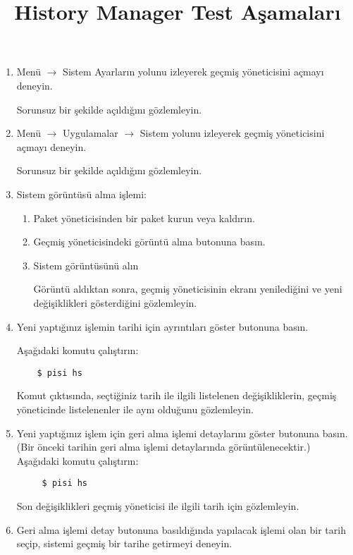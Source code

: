 \documentclass[a4paper,10pt]{article}
\title{History Manager Test Aşamaları}
\begin{document}
\maketitle

\begin{enumerate}
\item Menü $\rightarrow$ Sistem Ayarların yolunu izleyerek geçmiş yöneticisini açmayı deneyin.

Sorunsuz bir şekilde açıldığını gözlemleyin.
\item Menü $\rightarrow$ Uygulamalar $\rightarrow$ Sistem yolunu izleyerek geçmiş yöneticisini açmayı deneyin.

Sorunsuz bir şekilde açıldığını gözlemleyin.
\item Sistem görüntüsü alma işlemi:
\begin{enumerate}
    \item Paket yöneticisinden bir paket kurun veya kaldırın.
    \item Geçmiş yöneticisindeki görüntü alma butonuna basın.
    \item Sistem görüntüsünü alın

   Görüntü aldıktan sonra, geçmiş yöneticisinin ekranı yenilediğini ve yeni değişiklikleri gösterdiğini gözlemleyin.
\end{enumerate}

\item Yeni yaptığınız işlemin tarihi için ayrıntıları göster butonuna basın.

    Aşağıdaki komutu çalıştırın:
\begin{verbatim}
    $ pisi hs
\end{verbatim} 

    Komut çıktısında, seçtiğiniz tarih ile ilgili listelenen değişikliklerin, geçmiş yöneticinde listelenenler ile aynı olduğunu gözlemleyin.

\item Yeni yaptığınız işlem için geri alma işlemi detaylarını göster butonuna basın. (Bir önceki tarihin geri alma işlemi detaylarında görüntülenecektir.)
    Aşağıdaki komutu çalıştırın:
\begin{verbatim}
     $ pisi hs
\end{verbatim} 
    Son değişiklikleri geçmiş yöneticisi ile ilgili tarih için gözlemleyin.


\item Geri alma işlemi detay butonuna basıldığında yapılacak işlemi olan bir tarih seçip, sistemi geçmiş bir tarihe getirmeyi deneyin. 


\end{enumerate}
\end{document}
